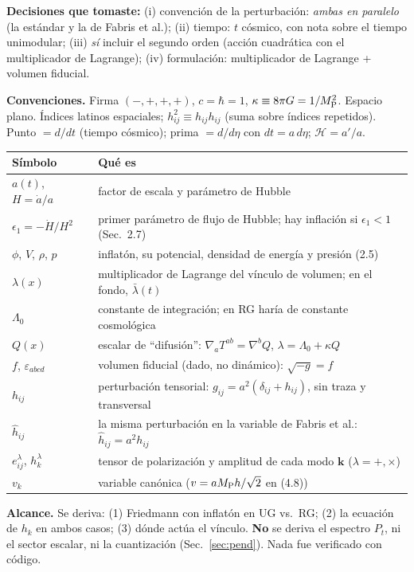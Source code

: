 \documentclass[11pt,a4paper]{article}
\newcommand{\MP}{M_{\rm P}}
\newcommand{\sub}[2]{\par\medskip\noindent{\bfseries\color{NavyBlue}#1}\quad\textbf{#2}}
\begin{document}
\textbf{Decisiones que tomaste:} (i) convención de la perturbación: \emph{ambas en paralelo} (la estándar y la de Fabris et al.); (ii) tiempo: $t$ cósmico, con nota sobre el tiempo unimodular; (iii) \emph{sí} incluir el segundo orden (acción cuadrática con el multiplicador de Lagrange); (iv) formulación: multiplicador de Lagrange + volumen fiducial.

\textbf{Convenciones.} Firma $(-,+,+,+)$, $c=\hbar=1$, $\kappa\equiv8\pi G=1/\MP^2$. Espacio plano. Índices latinos espaciales; $h_{ij}^2\equiv h_{ij}h_{ij}$ (suma sobre índices repetidos). Punto $=d/dt$ (tiempo cósmico); prima $=d/d\eta$ con $dt=a\,d\eta$; $\mathcal H=a'/a$.

\begin{center}\small
\renewcommand{\arraystretch}{1.2}
\begin{tabular}{@{}L{2.6cm}L{12.5cm}@{}}
\toprule
\textbf{Símbolo} & \textbf{Qué es}\\
\midrule
$a(t)$, $H=\dot a/a$ & factor de escala y parámetro de Hubble\\
$\epsilon_1=-\dot H/H^2$ & primer parámetro de flujo de Hubble; hay inflación si $\epsilon_1<1$ (Sec.~2.7)\\
$\phi$, $V$, $\rho$, $p$ & inflatón, su potencial, densidad de energía y presión (2.5)\\
$\lambda(x)$ & multiplicador de Lagrange del vínculo de volumen; en el fondo, $\bar\lambda(t)$\\
$\Lambda_0$ & constante de integración; en RG haría de constante cosmológica\\
$Q(x)$ & escalar de ``difusión'': $\nabla_aT^{ab}=\nabla^bQ$, $\lambda=\Lambda_0+\kappa Q$\\
$f$, $\varepsilon_{abcd}$ & volumen fiducial (dado, no dinámico): $\sqrt{-g}=f$\\
$h_{ij}$ & perturbación tensorial: $g_{ij}=a^2(\delta_{ij}+h_{ij})$, sin traza y transversal\\
$\hat h_{ij}$ & la misma perturbación en la variable de Fabris et al.: $\hat h_{ij}=a^2h_{ij}$\\
$e^\lambda_{ij}$, $h_k^\lambda$ & tensor de polarización y amplitud de cada modo $\mathbf k$ ($\lambda=+,\times$)\\
$v_k$ & variable canónica ($v=a\MP h/\sqrt2$ en (4.8)) \\
\bottomrule
\end{tabular}
\end{center}

\sub{0.5}{Alcance.} Se deriva: (1) Friedmann con inflatón en UG vs.\ RG; (2) la ecuación de $h_k$ en ambos casos; (3) dónde actúa el vínculo. \textbf{No} se deriva el espectro $P_t$, ni el sector escalar, ni la cuantización (Sec.~\ref{sec:pend}). Nada fue verificado con código.
\end{document}
